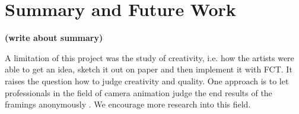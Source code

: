 \section{Summary and Future Work}
\textbf{(write about summary)}

A limitation of this project was the study of creativity, i.e. how the artists were able to get an idea, sketch it out on paper and then implement it with FCT. It raises the question how to judge creativity and quality. One approach is to let professionals in the field of camera animation judge the end results of the framings anonymously \cite{sadeghi_artist_2010}. We encourage more research into this field.